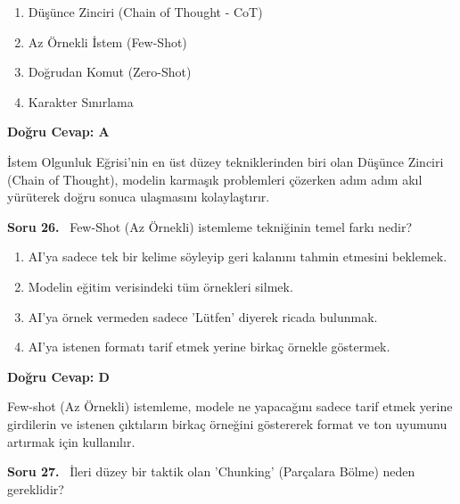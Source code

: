 \documentclass[11pt,a4paper,openany]{book}
\begin{document}
\begin{enumerate}[label=\Alph*), leftmargin=25pt, topsep=4pt, itemsep=2pt]
        \item Düşünce Zinciri (Chain of Thought - CoT)
        \item Az Örnekli İstem (Few-Shot)
        \item Doğrudan Komut (Zero-Shot)
        \item Karakter Sınırlama
\end{enumerate}

\vspace{4pt}
\begin{tcolorbox}[title=Cevap ve Açıklama, colback=gray!3!white, colframe=primarycolor!90!black, arc=2mm, fonttitle=\bfseries\sffamily, top=6pt, bottom=6pt]
    \textbf{Doğru Cevap: A}

    \vspace{2pt}
    İstem Olgunluk Eğrisi'nin en üst düzey tekniklerinden biri olan Düşünce Zinciri (Chain of Thought), modelin karmaşık problemleri çözerken adım adım akıl yürüterek doğru sonuca ulaşmasını kolaylaştırır.
\end{tcolorbox}
\vspace{10pt}
\needspace{5cm}
\vspace{8pt}
\noindent\textbf{\large\sffamily Soru 26.} \ Few-Shot (Az Örnekli) istemleme tekniğinin temel farkı nedir?

\begin{enumerate}[label=\Alph*), leftmargin=25pt, topsep=4pt, itemsep=2pt]
        \item AI'ya sadece tek bir kelime söyleyip geri kalanını tahmin etmesini beklemek.
        \item Modelin eğitim verisindeki tüm örnekleri silmek.
        \item AI'ya örnek vermeden sadece 'Lütfen' diyerek ricada bulunmak.
        \item AI'ya istenen formatı tarif etmek yerine birkaç örnekle göstermek.
\end{enumerate}

\vspace{4pt}
\begin{tcolorbox}[title=Cevap ve Açıklama, colback=gray!3!white, colframe=primarycolor!90!black, arc=2mm, fonttitle=\bfseries\sffamily, top=6pt, bottom=6pt]
    \textbf{Doğru Cevap: D}
    
    \vspace{2pt}
    Few-shot (Az Örnekli) istemleme, modele ne yapacağını sadece tarif etmek yerine girdilerin ve istenen çıktıların birkaç örneğini göstererek format ve ton uyumunu artırmak için kullanılır.
\end{tcolorbox}
\vspace{10pt}
\needspace{5cm}
\vspace{8pt}
\noindent\textbf{\large\sffamily Soru 27.} \ İleri düzey bir taktik olan 'Chunking' (Parçalara Bölme) neden gereklidir?
\end{document}
